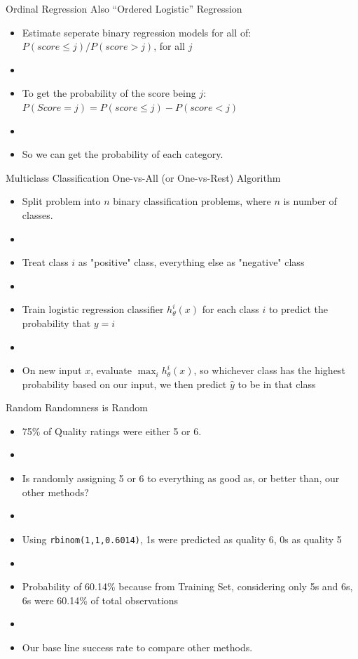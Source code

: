 \documentclass{beamer}
\begin{document}
\begin{frame}{Ordinal Regression}
	Also ``Ordered Logistic'' Regression
	\begin{itemize}
	\item Estimate seperate binary regression models for all of: $P(score\leq j)/P(score>j)$, for all $j$
	\item[]
	\item To get the probability of the score being $j$: $P(Score=j)=P(score\leq j) - P(score < j)$
	\item[]
	\item So we can get the probability of each category.
	\end{itemize}
\end{frame}

\begin{frame}{Multiclass Classification}
	One-vs-All (or One-vs-Rest) Algorithm
	\begin{itemize}
	\item Split problem into $n$ binary classification problems, where $n$ is number of classes.
	\item[]
	\item Treat class $i$ as "positive" class, everything else as "negative" class
	\item[]
	\item Train logistic regression classifier $h_{\theta}^{i}(x)$ for each class $i$ to predict the probability that $y=i$
	\item[]
	\item On new input $x$, evaluate $\max_{i}h_{\theta}^{i}(x)$, so whichever class has the highest probability based on our input, we then predict $\hat{y}$ to be in that class
	\end{itemize}

\end{frame}

\begin{frame}{Random Randomness is Random}
	\begin{itemize}
	\item 75\% of Quality ratings were either 5 or 6. 
	\item[]
	\item Is randomly assigning 5 or 6 to everything as good as, or better than, our other methods?
	\item[]
	\item Using \texttt{rbinom(1,1,0.6014)}, 1s were predicted as quality 6, 0s as quality 5
	\item[]
	\item Probability of 60.14\% because from Training Set, considering only 5s and 6s, 6s were 60.14\% of total observations
	\item[]
	\item Our base line success rate to compare other methods.
	\end{itemize}
\end{frame}
\end{document}

